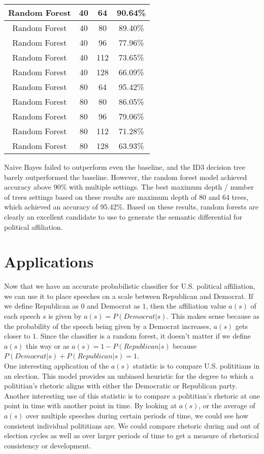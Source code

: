 \documentclass{amsart}
\theoremstyle{definition}
\theoremstyle{remark}
\numberwithin{equation}{section}
\begin{document}
\begin{center}
\begin{tabular}{||c c c c||}
\hline
Random Forest & 40 & 64 & 90.64\%\\
\hline
Random Forest & 40 & 80 & 89.40\%\\
\hline
Random Forest & 40 & 96 & 77.96\%\\
\hline
Random Forest & 40 & 112 & 73.65\%\\
\hline
Random Forest & 40 & 128 & 66.09\%\\
\hline
Random Forest & 80 & 64 & 95.42\%\\
\hline
Random Forest & 80 & 80 & 86.05\%\\
\hline
Random Forest & 80 & 96 & 79.06\%\\
\hline
Random Forest & 80 & 112 & 71.28\%\\
\hline
Random Forest & 80 & 128 & 63.93\%\\
[1ex]
\hline
\end{tabular}
\end{center}

Naive Bayes failed to outperform even the baseline, and the ID3 decision tree barely outperformed the baseline. However, the random forest model achieved accuracy above 90\% with multiple settings. The best maximum depth / number of trees settings based on these results are maximum depth of 80 and 64 trees, which achieved an accuracy of 95.42\%. Based on these results, random forests are clearly an excellent candidate to use to generate the semantic differential for political affiliation.\\

\section{Applications}
Now that we have an accurate probabilistic classifier for U.S. political affiliation, we can use it to place speeches on a scale between Republican and Democrat. If we define Republican as $0$ and Democrat as $1$, then the affiliation value $a(s)$ of each speech $s$ is given by $a(s) = P(Democrat \vert s)$. This makes sense because as the probability of the speech being given by a Democrat increases, $a(s)$ gets closer to $1$. Since the classifier is a random forest, it doesn't matter if we define $a(s)$ this way or as $a(s) = 1 - P(Republican \vert s)$ because $P(Democrat \vert s) + P(Republican \vert s) = 1$.\\
One interesting application of the $a(s)$ statistic is to compare U.S. polititians in an election. This model provides an unbiased heuristic for the degree to which a polititian's rhetoric aligns with either the Democratic or Republican party.\\
Another interesting use of this statistic is to compare a polititian's rhetoric at one point in time with another point in time. By looking at $a(s)$, or the average of $a(s)$ over multiple speeches during certain periods of time, we could see how consistent individual polititians are. We could compare rhetoric during and out of election cycles as well as over larger periods of time to get a measure of rhetorical consistency or development.\\
\end{document}
